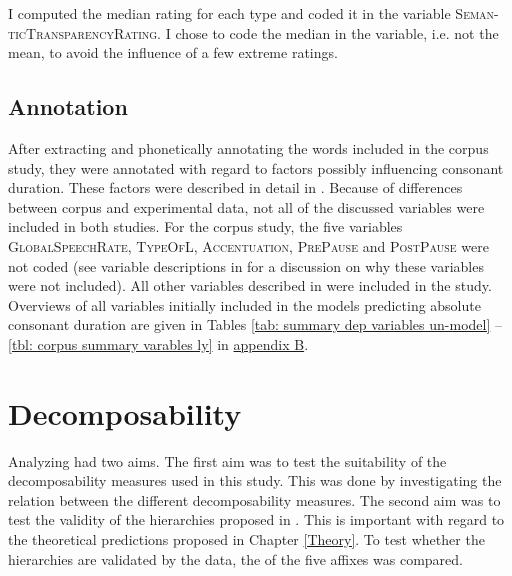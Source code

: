 I computed the median rating for each type and coded it in the variable \textsc{Seman-ticTransparencyRating}. I chose to code the median in the variable, i.e. not the mean, to avoid the influence of a few extreme ratings. 






\subsection{Annotation} \label{Overview of the Variables in the Data Set corpus}

After extracting and phonetically annotating the words included in the corpus study, they were annotated with regard to factors possibly influencing consonant duration. These factors were described in detail in . Because of differences between corpus and experimental data, not all of the discussed variables were included in both studies. For the corpus study, the five variables \textsc{GlobalSpeechRate}, \textsc{TypeOfL}, \textsc{Accentuation}, \textsc{PrePause} and \textsc{PostPause} were not coded (see variable descriptions in  for a discussion on why these variables were not included). 
All other variables described in  were included in the study. 
Overviews of all variables initially included in the models predicting absolute consonant duration are given in Tables \ref{tab: summary dep variables un-model} -- \ref{tbl: corpus summary varables ly} in \hyperref[App B: Summaries of variables in initial models of corpus study]{appendix B}. 




\section{Decomposability} \label{corpus dec}

Analyzing  had two aims. The first aim was to test the suitability of the decomposability measures used in this study. This was done by investigating the relation between the different decomposability measures.  
The second aim was to test the validity of the  hierarchies proposed in .  This is important with regard to the theoretical predictions proposed in Chapter \ref{Theory}. To test whether the hierarchies are validated by the data, the  of the five affixes was compared.




